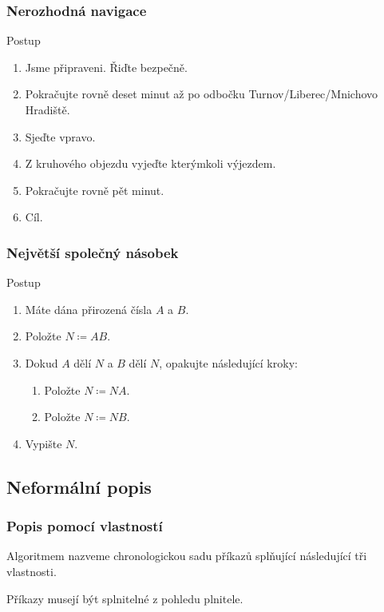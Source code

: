 \documentclass[aspectratio=169,11pt,svgnames,handout]{beamer}
\begin{document}
\begin{frame}
 \frametitle{Nerozhodná navigace}
 \begin{block}{Postup}
  \begin{enumerate}
   \item Jsme připraveni. Řiďte bezpečně.
   \item Pokračujte rovně deset minut až po odbočku Turnov/Liberec/Mnichovo
    Hradiště.
   \item Sjeďte vpravo.
   \item Z kruhového objezdu vyjeďte kterýmkoli výjezdem.
   \item Pokračujte rovně pět minut.
   \item Cíl.
  \end{enumerate}
 \end{block}
\end{frame}

\begin{frame}
 \frametitle{Největší společný násobek}
 \begin{block}{Postup}
  \begin{enumerate}
   \item Máte dána přirozená čísla $A$ a $B$.
   \item Položte $N \coloneqq AB$.
   \item Dokud $A$ dělí $N$ a $B$ dělí $N$, opakujte následující kroky:
    \begin{enumerate}[label=\roman*.]
     \item Položte $N \coloneqq NA$.
     \item Položte $N \coloneqq NB$.
    \end{enumerate}
   \item Vypište $N$.
  \end{enumerate}
 \end{block}
\end{frame}

\subsection{Neformální popis}
\begin{frame}
 \subsectionpage
\end{frame}

\begin{frame}
 \frametitle{Popis pomocí vlastností}
 Algoritmem nazveme \alert{chronologickou sadu příkazů} splňující
 následující tři vlastnosti.
 \pause
 \begin{tcolorbox}[title=Vlastnost 1: splnitelnost,width=.8\textwidth,center]
  Příkazy musejí být splnitelné \alert{z pohledu plnitele}.
 \end{tcolorbox}
\end{frame}
\end{document}
